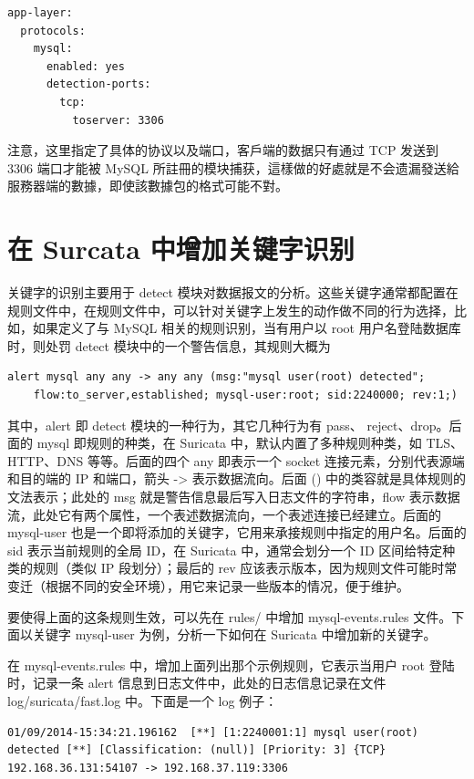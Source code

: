 \begin{lstlisting}
app-layer:
  protocols:
    mysql:
      enabled: yes
      detection-ports:
        tcp:
          toserver: 3306
\end{lstlisting}

注意，这里指定了具体的协议以及端口，客戶端的数据只有通过 TCP 发送到 3306 端口才能被 MySQL 所註冊的模块捕获，這樣做的好處就是不会遗漏發送給服務器端的數據，即使該數據包的格式可能不對。

\section{在 Surcata 中增加关键字识别}
关键字的识别主要用于 detect 模块对数据报文的分析。这些关键字通常都配置在规则文件中，在规则文件中，可以针对关键字上发生的动作做不同的行为选择，比如，如果定义了与 MySQL 相关的规则识别，当有用户以 {\cf root} 用户名登陆数据库时，则处罚 detect 模块中的一个警告信息，其规则大概为

\begin{lstlisting}
alert mysql any any -> any any (msg:"mysql user(root) detected";
	flow:to_server,established; mysql-user:root; sid:2240000; rev:1;)
\end{lstlisting}

其中，{\cf alert} 即 detect 模块的一种行为，其它几种行为有 {\cf pass}、 {\cf reject}、{\cf drop}。后面的 {\cf mysql} 即规则的种类，在 Suricata 中，默认内置了多种规则种类，如 TLS、HTTP、DNS 等等。后面的四个 {\cf any} 即表示一个 socket 连接元素，分别代表源端和目的端的 IP 和端口，箭头 {\cf ->} 表示数据流向。后面 {\cf()} 中的类容就是具体规则的文法表示；此处的 {\cf msg} 就是警告信息最后写入日志文件的字符串，{\cf flow} 表示数据流，此处它有两个属性，一个表述数据流向，一个表述连接已经建立。后面的 {\cf mysql-user} 也是一个即将添加的关键字，它用来承接规则中指定的用户名。后面的 {\cf sid} 表示当前规则的全局 ID，在 Suricata 中，通常会划分一个 ID 区间给特定种类的规则（类似 IP 段划分）；最后的 {\cf rev} 应该表示版本，因为规则文件可能时常变迁（根据不同的安全环境），用它来记录一些版本的情况，便于维护。

要使得上面的这条规则生效，可以先在 {\ff rules/} 中增加 {\ff mysql-events.rules} 文件。下面以关键字 {\cf mysql-user} 为例，分析一下如何在 Suricata 中增加新的关键字。

在 {\cf mysql-events.rules} 中，增加上面列出那个示例规则，它表示当用户 {\cf root} 登陆时，记录一条 {\cf alert} 信息到日志文件中，此处的日志信息记录在文件 {\ff log/suricata/fast.log} 中。下面是一个 log 例子：

\begin{lstlisting}[breaklines=true]
01/09/2014-15:34:21.196162  [**] [1:2240001:1] mysql user(root) detected [**] [Classification: (null)] [Priority: 3] {TCP} 192.168.36.131:54107 -> 192.168.37.119:3306
\end{lstlisting}

